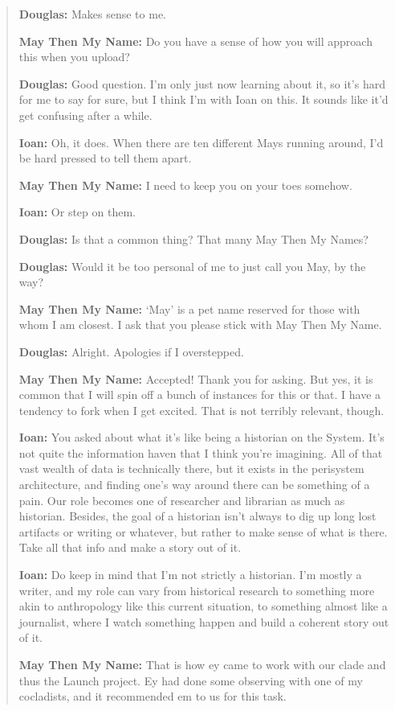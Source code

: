 \begin{quote}
\textbf{Douglas:} Makes sense to me.

\textbf{May Then My Name:} Do you have a sense of how you will approach this when you upload?

\textbf{Douglas:} Good question. I'm only just now learning about it, so it's hard for me to say for sure, but I think I'm with Ioan on this. It sounds like it'd get confusing after a while.

\textbf{Ioan:} Oh, it does. When there are ten different Mays running around, I'd be hard pressed to tell them apart.

\textbf{May Then My Name:} I need to keep you on your toes somehow.

\textbf{Ioan:} Or step on them.

\textbf{Douglas:} Is that a common thing? That many May Then My Names?

\textbf{Douglas:} Would it be too personal of me to just call you May, by the way?

\textbf{May Then My Name:} `May' is a pet name reserved for those with whom I am closest. I ask that you please stick with May Then My Name.

\textbf{Douglas:} Alright. Apologies if I overstepped.

\textbf{May Then My Name:} Accepted! Thank you for asking. But yes, it is common that I will spin off a bunch of instances for this or that. I have a tendency to fork when I get excited. That is not terribly relevant, though.

\textbf{Ioan:} You asked about what it's like being a historian on the System. It's not quite the information haven that I think you're imagining. All of that vast wealth of data is technically there, but it exists in the perisystem architecture, and finding one's way around there can be something of a pain. Our role becomes one of researcher and librarian as much as historian. Besides, the goal of a historian isn't always to dig up long lost artifacts or writing or whatever, but rather to make sense of what is there. Take all that info and make a story out of it.

\textbf{Ioan:} Do keep in mind that I'm not strictly a historian. I'm mostly a writer, and my role can vary from historical research to something more akin to anthropology like this current situation, to something almost like a journalist, where I watch something happen and build a coherent story out of it.

\textbf{May Then My Name:} That is how ey came to work with our clade and thus the Launch project. Ey had done some observing with one of my cocladists, and it recommended em to us for this task.


\end{quote}
